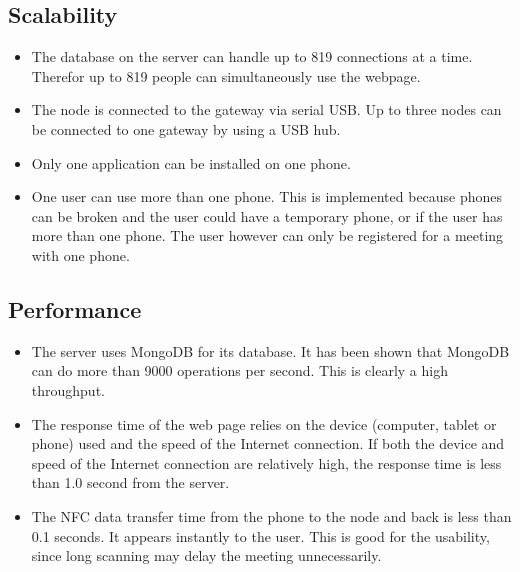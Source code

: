 \subsection{Scalability}
\begin{itemize}
\item The database on the server can handle up to 819 connections at a time. Therefor up to  819 people can simultaneously use the webpage.
\item The node is connected to the gateway via serial USB. Up to three nodes can be connected to one gateway by using a USB hub. 
\item Only one application can be installed on one phone. 
\item One user can use more than one phone. This is implemented because phones can be broken and the user could have a temporary phone, or if the user has more than one phone. The user however can only be registered for a meeting with one phone. 

\end{itemize}

\subsection{Performance}
\begin{itemize}
\item The server uses MongoDB for its database. It has been shown that MongoDB can do more than 9000 operations per second. This is clearly a high throughput. 
\item The response time of the web page relies on the device (computer, tablet or phone) used and the speed of the Internet connection. If both the device and speed of the Internet connection are relatively high, the response time is less than 1.0 second from the server.
\item The NFC data transfer time from the phone to the node and back is less than 0.1 seconds. It appears instantly to the user. This is good for the usability, since long scanning may delay the meeting unnecessarily. 
\end{itemize}


